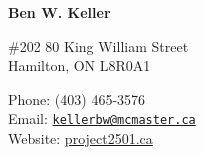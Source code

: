 \documentclass[letterpaper]{article}
\begin{document}
{\huge\bf Ben W. Keller}

\vspace{0.25in}

\begin{minipage}{0.5\textwidth}
    \#202 80 King William Street\\
  Hamilton, ON L8R0A1
\end{minipage}
\begin{minipage}{0.5\textwidth}
  Phone: (403) 465-3576 \\
  Email: \href{mailto:kellerbw@mcmaster.ca}{\tt kellerbw@mcmaster.ca} \\
  Website: \href{www.project2501.ca}{project2501.ca}
\end{minipage}
\end{document}
